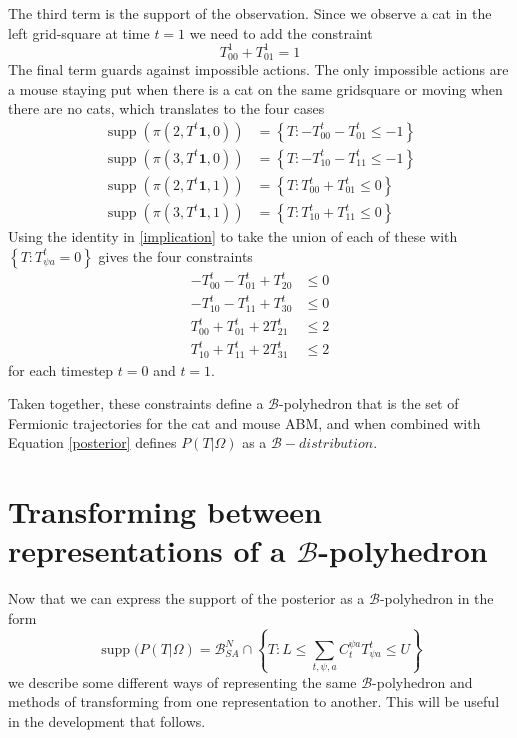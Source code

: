 \documentclass{article}
\DeclareMathOperator\supp{supp}
\begin{document}
The third term is the support of the observation. Since we observe a cat in the left grid-square at time $t=1$ we need to add the constraint
\[
T^1_{0 0} + T^1_{0 1} = 1
\]
The final term guards against impossible actions. The only impossible actions are a mouse staying put when there is a cat on the same gridsquare or moving when there are no cats, which translates to the four cases
\[
\begin{aligned}
\supp(\pi(2,T^t\mathbf{1},0)) &= \left\{ T: -T^t_{0 0} - T^t_{0 1} \le -1 \right\}\\
\supp(\pi(3,T^t\mathbf{1},0)) &= \left\{ T: -T^t_{1 0} - T^t_{1 1} \le -1 \right\}\\
\supp(\pi(2,T^t\mathbf{1},1)) &= \left\{ T: T^t_{0 0} + T^t_{0 1} \le 0 \right\}\\
\supp(\pi(3,T^t\mathbf{1},1)) &= \left\{ T: T^t_{1 0} + T^t_{1 1} \le 0 \right\}
\end{aligned}
\]
Using the identity in \eqref{implication} to take the union of each of these with $\left\{T: T^t_{\psi a} = 0\right\}$ gives the four constraints
\[
\begin{aligned}
-T^t_{0 0} - T^t_{0 1} + T^t_{2 0} & \le 0\\
-T^t_{1 0} - T^t_{1 1} + T^t_{3 0} & \le 0\\
T^t_{0 0} + T^t_{0 1} + 2T^t_{2 1} & \le 2 \\
T^t_{1 0} + T^t_{1 1} + 2T^t_{3 1} & \le 2
\end{aligned}
\]
for each timestep $t=0$ and $t=1$.

Taken together, these constraints define a $\mathcal{B}$-polyhedron that is the set of Fermionic trajectories for the cat and mouse ABM, and when combined with Equation \eqref{posterior} defines $P(T|\Omega)$ as a $\mathcal{B}-distribution$.

\section{Transforming between representations of a $\mathcal{B}$-polyhedron}


Now that we can express the support of the posterior as a $\mathcal{B}$-polyhedron in the form
\begin{equation}
\supp(P(T|\Omega) = \mathcal{B}^N_{SA} \cap \left\{T: L \le \sum_{t,\psi,a} C^{\psi a}_t T^t_{\psi a} \le U \right\}
\label{bPolySupport}
\end{equation}
we describe some different ways of representing the same $\mathcal{B}$-polyhedron and methods of transforming from one representation to another. This will be useful in the development that follows.
\end{document}
